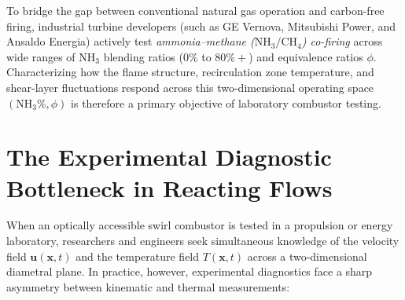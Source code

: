 To bridge the gap between conventional natural gas operation and carbon-free firing, industrial turbine developers (such as GE Vernova, Mitsubishi Power, and Ansaldo Energia) actively test \emph{ammonia--methane ($\text{NH}_3/\text{CH}_4$) co-firing} across wide ranges of $\text{NH}_3$ blending ratios ($0\%$ to $80\%+$) and equivalence ratios $\phi$. Characterizing how the flame structure, recirculation zone temperature, and shear-layer fluctuations respond across this two-dimensional operating space $(\text{NH}_3\%, \phi)$ is therefore a primary objective of laboratory combustor testing.

\section{The Experimental Diagnostic Bottleneck in Reacting Flows}
\label{sec:intro_diagnostics}

When an optically accessible swirl combustor is tested in a propulsion or energy laboratory, researchers and engineers seek simultaneous knowledge of the velocity field $\mathbf{u}(\mathbf{x}, t)$ and the temperature field $T(\mathbf{x}, t)$ across a two-dimensional diametral plane. In practice, however, experimental diagnostics face a sharp asymmetry between kinematic and thermal measurements:

